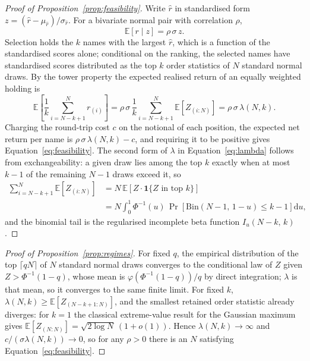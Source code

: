 \documentclass{article}
\theoremstyle{plain}
\theoremstyle{remark}
\begin{document}
\begin{proof}[Proof of Proposition~\ref{prop:feasibility}]
Write $\hat r$ in standardised form $z = (\hat r - \mu_{\hat r})/\sigma_{\hat r}$.
For a bivariate normal pair with correlation $\rho$,
\begin{equation}
\mathbb{E}[r \mid z] = \rho\,\sigma\,z .
\end{equation}
Selection holds the $k$ names with the largest $\hat r$, which is a function of
the standardised scores alone; conditional on the ranking, the selected names
have standardised scores distributed as the top $k$ order statistics of $N$
standard normal draws. By the tower property the expected realised return of an
equally weighted holding is
\begin{equation}
\mathbb{E}\!\left[\frac{1}{k}\sum_{i=N-k+1}^{N} r_{(i)}\right]
= \rho\,\sigma\,\frac{1}{k}\sum_{i=N-k+1}^{N}\mathbb{E}\!\left[Z_{(i:N)}\right]
= \rho\,\sigma\,\lambda(N,k).
\end{equation}
Charging the round-trip cost $c$ on the notional of each position, the expected
net return per name is $\rho\,\sigma\,\lambda(N,k) - c$, and requiring it to be
positive gives Equation~\ref{eq:feasibility}. The second form of $\lambda$ in
Equation~\ref{eq:lambda} follows from exchangeability: a given draw lies among
the top $k$ exactly when at most $k-1$ of the remaining $N-1$ draws exceed it, so
\begin{align}
\sum_{i=N-k+1}^{N}\mathbb{E}\!\left[Z_{(i:N)}\right]
&= N\,\mathbb{E}\!\left[Z \cdot \mathbf{1}\{Z \text{ in top } k\}\right]
\nonumber\\
&= N\int_0^1 \Phi^{-1}(u)\,
  \Pr\!\left[\mathrm{Bin}(N-1,\,1-u) \le k-1\right]\mathrm{d}u,
\end{align}
and the binomial tail is the regularised incomplete beta function
$I_u(N-k,\,k)$. \end{proof}

\begin{proof}[Proof of Proposition~\ref{prop:regimes}]
For fixed $q$, the empirical distribution of the top $\lceil qN \rceil$ of $N$
standard normal draws converges to the conditional law of $Z$ given
$Z > \Phi^{-1}(1-q)$, whose mean is $\varphi(\Phi^{-1}(1-q))/q$ by direct
integration; $\lambda$ is that mean, so it converges to the same finite limit.
For fixed $k$, $\lambda(N,k) \ge \mathbb{E}[Z_{(N-k+1:N)}]$, and the smallest
retained order statistic already diverges: for $k=1$ the classical extreme-value
result for the Gaussian maximum gives
$\mathbb{E}[Z_{(N:N)}] = \sqrt{2\log N}\,(1 + o(1))$. Hence $\lambda(N,k) \to
\infty$ and $c/(\sigma\lambda(N,k)) \to 0$, so for any $\rho > 0$ there is an
$N$ satisfying Equation~\ref{eq:feasibility}. \end{proof}
\end{document}
